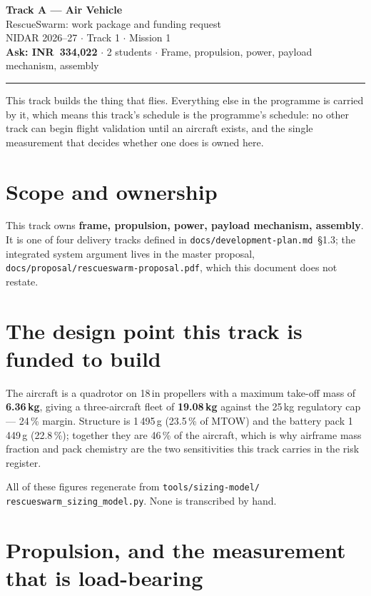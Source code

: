 \documentclass[11pt,a4paper]{article}
\newcommand{\inr}[1]{INR~#1}
\begin{document}
\begin{center}
{\LARGE\bfseries Track A --- Air Vehicle}\\[3mm]
{\large RescueSwarm: work package and funding request}\\[2mm]
NIDAR 2026--27 $\cdot$ Track 1 $\cdot$ Mission 1\\[1mm]
\textbf{Ask: \inr{334,022}} $\cdot$ 2 students $\cdot$ Frame, propulsion, power, payload mechanism, assembly
\end{center}
\vspace{2mm}\hrule\vspace{4mm}


This track builds the thing that flies. Everything else in the programme is
carried by it, which means this track's schedule is the programme's schedule:
no other track can begin flight validation until an aircraft exists, and the
single measurement that decides whether one does is owned here.

\section{Scope and ownership}

This track owns \textbf{frame, propulsion, power, payload mechanism, assembly}. It is one of four delivery tracks defined in
\texttt{docs/development-plan.md}~\S1.3; the integrated system argument lives in
the master proposal, \texttt{docs/proposal/rescueswarm-proposal.pdf}, which this
document does not restate.

\section{The design point this track is funded to build}

The aircraft is a quadrotor on 18\,in propellers with a maximum take-off mass of
\textbf{6.36\,kg}, giving a three-aircraft fleet of \textbf{19.08\,kg} against
the 25\,kg regulatory cap --- 24\,\% margin. Structure is 1\,495\,g (23.5\,\% of
MTOW) and the battery pack 1\,449\,g (22.8\,\%); together they are 46\,\% of the
aircraft, which is why airframe mass fraction and pack chemistry are the two
sensitivities this track carries in the risk register.

All of these figures regenerate from \texttt{tools/sizing-model/}\allowbreak
\texttt{rescueswarm\_sizing\_model.py}. None is transcribed by hand.

\section{Propulsion, and the measurement that is load-bearing}
\end{document}
